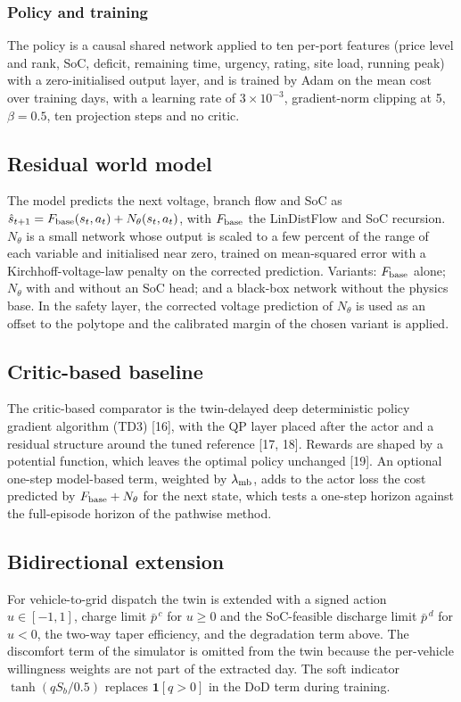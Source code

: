 \documentclass[11pt]{article}
\begin{document}
\subsubsection{Policy and training}
The policy is a causal shared network applied to ten per-port features (price level and rank, SoC, deficit, remaining time, urgency, rating, site load, running peak) with a zero-initialised output layer, and is trained by Adam on the mean cost over training days, with a learning rate of $3\times10^{-3}$, gradient-norm clipping at 5, $\beta=0.5$, ten projection steps and no critic.

\subsection{Residual world model}
The model predicts the next voltage, branch flow and SoC as $\hat s_{t+1}=F_{\rm base}(s_t,a_t)+N_\theta(s_t,a_t)$, with $F_{\rm base}$ the LinDistFlow and SoC recursion. $N_\theta$ is a small network whose output is scaled to a few percent of the range of each variable and initialised near zero, trained on mean-squared error with a Kirchhoff-voltage-law penalty on the corrected prediction. Variants: $F_{\rm base}$ alone; $N_\theta$ with and without an SoC head; and a black-box network without the physics base. In the safety layer, the corrected voltage prediction of $N_\theta$ is used as an offset to the polytope and the calibrated margin of the chosen variant is applied.

\subsection{Critic-based baseline}
The critic-based comparator is the twin-delayed deep deterministic policy gradient algorithm (TD3) [16], with the QP layer placed after the actor and a residual structure around the tuned reference [17, 18]. Rewards are shaped by a potential function, which leaves the optimal policy unchanged [19]. An optional one-step model-based term, weighted by $\lambda_{\rm mb}$, adds to the actor loss the cost predicted by $F_{\rm base}+N_\theta$ for the next state, which tests a one-step horizon against the full-episode horizon of the pathwise method.

\subsection{Bidirectional extension}
For vehicle-to-grid dispatch the twin is extended with a signed action $u\in[-1,1]$, charge limit $\bar p^{\,c}$ for $u\ge0$ and the SoC-feasible discharge limit $\bar p^{\,d}$ for $u<0$, the two-way taper efficiency, and the degradation term above. The discomfort term of the simulator is omitted from the twin because the per-vehicle willingness weights are not part of the extracted day. The soft indicator $\tanh(qS_b/0.5)$ replaces $\mathbf 1[q>0]$ in the DoD term during training.
\end{document}
